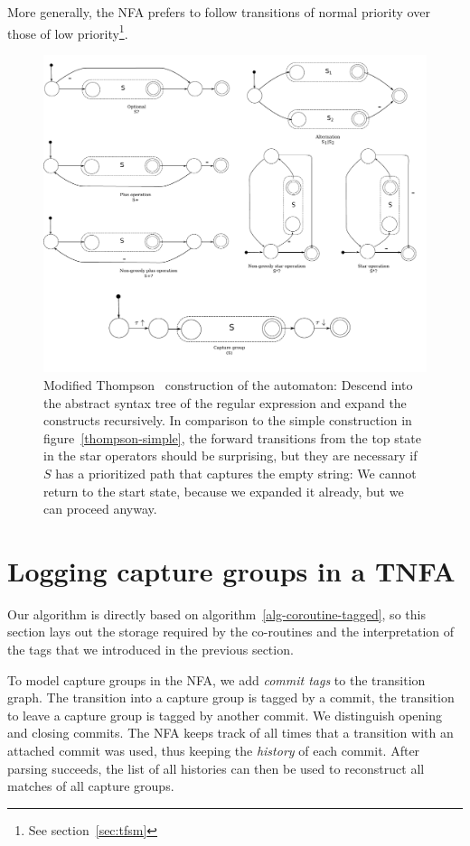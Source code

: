 \documentclass[11pt,a4paper,twoside,openright]{Thesis}
\theoremstyle{definition}
\newcommand{\Secref}[1]{section~\ref{sec:#1}}
\newcommand{\seclabel}[1]{\label{sec:#1}}
\begin{document}
More generally, the NFA prefers to follow transitions of normal
priority over those of low priority\footnote{See \Secref{tfsm}}.

\begin{figure}[tb] \includegraphics[width=\linewidth]{graphs/thompson}
  \caption[Modified Thompson construction]{Modified Thompson~\cite{Thom68a}
  construction of the automaton: Descend into the abstract syntax tree of the
  regular expression and expand the constructs recursively. In comparison to
  the simple construction in figure~\ref{thompson-simple}, the forward
  transitions from the top state in the star operators should be surprising,
  but they are necessary if $S$ has a prioritized path that captures the empty
  string: We cannot return to the start state, because we expanded it already,
  but we can proceed anyway.}
\label{fig:thompson-construction}
\end{figure}

\section{Logging capture groups in a TNFA}\seclabel{tnfa}

Our algorithm is directly based on algorithm~\ref{alg-coroutine-tagged}, so 
this section lays out the storage required by the co-routines and the
interpretation of the tags that we introduced in the previous section.

To model capture groups in the NFA, we add \emph{commit tags} to
the transition graph. The transition into a capture group is tagged
by a commit, the transition to leave a capture group is tagged by
another commit. We distinguish opening and closing commits. The
NFA keeps track of all times that a transition with an attached
commit was used, thus keeping the \emph{history} of each commit.
After parsing succeeds, the list of all histories can then be used
to reconstruct all matches of all capture groups.
\end{document}
